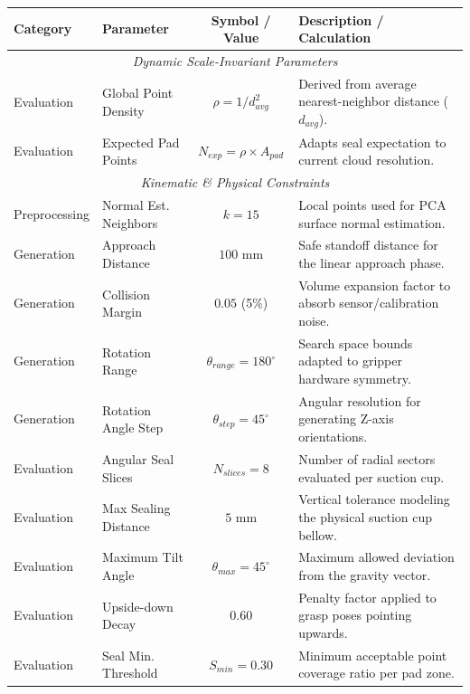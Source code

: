 \documentclass[12pt, a4paper]{article}
\begin{document}
\renewcommand{\arraystretch}{1.4}

\begin{table}
    \centering
    \small 
    \begin{tabularx}{\textwidth}{@{}llc >{\raggedright\arraybackslash}X@{}}
        \toprule
        \textbf{Category} & \textbf{Parameter} & \textbf{Symbol / Value} & \textbf{Description / Calculation} \\
        \midrule
        \multicolumn{4}{c}{\textit{Dynamic Scale-Invariant Parameters}} \\
        \midrule
        Evaluation & Global Point Density & $\rho = 1 / d_{avg}^2$ & Derived from average nearest-neighbor distance ($d_{avg}$). \\
        Evaluation & Expected Pad Points & $N_{exp} = \rho \times A_{pad}$ & Adapts seal expectation to current cloud resolution. \\
        \midrule
        \multicolumn{4}{c}{\textit{Kinematic \& Physical Constraints}} \\
        \midrule
        Preprocessing & Normal Est. Neighbors & $k = 15$ & Local points used for PCA surface normal estimation. \\
        Generation & Approach Distance & $100$ mm & Safe standoff distance for the linear approach phase. \\
        Generation & Collision Margin & $0.05$ (5\%) & Volume expansion factor to absorb sensor/calibration noise. \\
        Generation & Rotation Range & $\theta_{range} = 180^\circ$ & Search space bounds adapted to gripper hardware symmetry. \\
        Generation & Rotation Angle Step & $\theta_{step} = 45^\circ$ & Angular resolution for generating Z-axis orientations. \\
        Evaluation & Angular Seal Slices & $N_{slices} = 8$ & Number of radial sectors evaluated per suction cup. \\
        Evaluation & Max Sealing Distance & $5$ mm & Vertical tolerance modeling the physical suction cup bellow. \\
        Evaluation & Maximum Tilt Angle & $\theta_{max} = 45^\circ$ & Maximum allowed deviation from the gravity vector. \\
        Evaluation & Upside-down Decay & $0.60$ & Penalty factor applied to grasp poses pointing upwards. \\
        Evaluation & Seal Min. Threshold & $S_{min} = 0.30$ & Minimum acceptable point coverage ratio per pad zone. \\

\end{tabularx}
\end{table}
\end{document}
